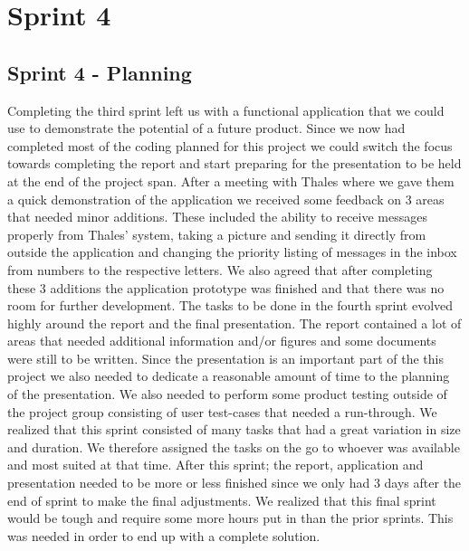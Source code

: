 \chapter{Sprint 4}

\section{Sprint 4 - Planning}


Completing the third sprint left us with a functional application that we could use to demonstrate the potential of a future product. Since we now had completed most of the coding planned for this project we could switch the focus towards completing the report and start preparing for the presentation to be held at the end of the project span.
\newline
After a meeting with Thales where we gave them a quick demonstration of the application we received some feedback on 3 areas that needed minor additions. These included the ability to receive messages properly from Thales' system, taking a picture and sending it directly from outside the application and changing the priority listing of messages in the inbox from numbers to the respective letters. We also agreed that after completing these 3 additions the application prototype was finished and that there was no room for further development.
\newline
The tasks to be done in the fourth sprint evolved highly around the report and the final presentation. The report contained a lot of areas that needed additional information and/or figures and some documents were still to be written. Since the presentation is an important part of the this project we also needed to dedicate a reasonable amount of time to the planning of the presentation. We also needed to perform some product testing outside of the project group consisting of user test-cases that needed a run-through. We realized that this sprint consisted of many tasks that had a great variation in size and duration. We therefore assigned the tasks on the go to whoever was available and most suited at that time.
\newline
After this sprint; the report, application and presentation needed to be more or less finished since we only had 3 days after the end of sprint to make the final adjustments. We realized that this final sprint would be tough and require some more hours put in than the prior sprints. This was needed in order to end up with a complete solution. 
      
